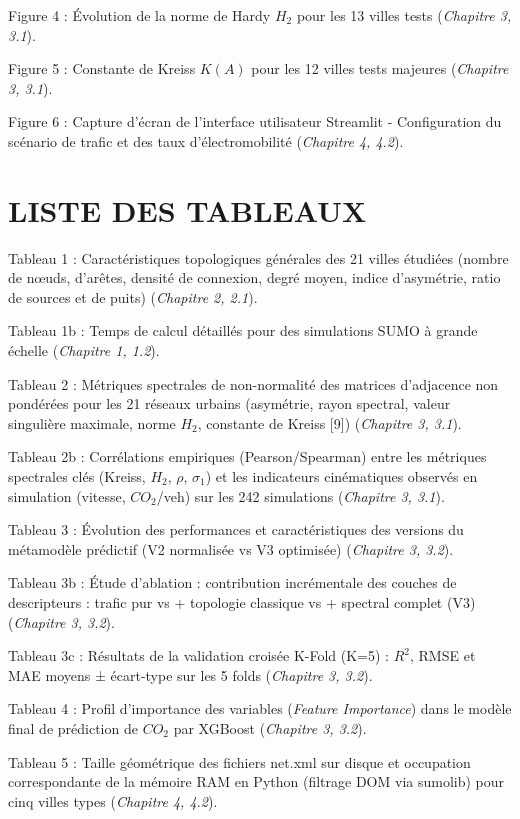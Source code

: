 \documentclass[10pt, a4paper]{article}
\begin{document}
Figure 4 : Évolution de la norme de Hardy \(H_2\) pour les 13 villes
tests (\emph{Chapitre 3, 3.1}).

Figure 5 : Constante de Kreiss \(K(A)\) pour les 12 villes tests
majeures (\emph{Chapitre 3, 3.1}).

Figure 6 : Capture d'écran de l'interface utilisateur Streamlit -
Configuration du scénario de trafic et des taux d'électromobilité
(\emph{Chapitre 4, 4.2}).

\newpage

\section{LISTE DES TABLEAUX}\label{liste-des-tableaux}

Tableau 1 : Caractéristiques topologiques générales des 21 villes
étudiées (nombre de nœuds, d'arêtes, densité de connexion, degré moyen,
indice d'asymétrie, ratio de sources et de puits) (\emph{Chapitre 2,
2.1}).

Tableau 1b : Temps de calcul détaillés pour des simulations SUMO à
grande échelle (\emph{Chapitre 1, 1.2}).

Tableau 2 : Métriques spectrales de non-normalité des matrices
d'adjacence non pondérées pour les 21 réseaux urbains (asymétrie, rayon
spectral, valeur singulière maximale, norme \(H_2\), constante de Kreiss
{[}9{]}) (\emph{Chapitre 3, 3.1}).

Tableau 2b : Corrélations empiriques (Pearson/Spearman) entre les
métriques spectrales clés (Kreiss, \(H_2\), \(\rho\), \(\sigma_1\)) et
les indicateurs cinématiques observés en simulation (vitesse,
\(CO_2\)/veh) sur les 242 simulations (\emph{Chapitre 3, 3.1}).

Tableau 3 : Évolution des performances et caractéristiques des versions
du métamodèle prédictif (V2 normalisée vs V3 optimisée) (\emph{Chapitre
3, 3.2}).

Tableau 3b : Étude d'ablation : contribution incrémentale des couches de
descripteurs : trafic pur vs + topologie classique vs + spectral complet
(V3) (\emph{Chapitre 3, 3.2}).

Tableau 3c : Résultats de la validation croisée K-Fold (K=5) : \(R^2\),
RMSE et MAE moyens ± écart-type sur les 5 folds (\emph{Chapitre 3,
3.2}).

Tableau 4 : Profil d'importance des variables (\emph{Feature
Importance}) dans le modèle final de prédiction de \(CO_2\) par XGBoost
(\emph{Chapitre 3, 3.2}).

Tableau 5 : Taille géométrique des fichiers net.xml sur disque et
occupation correspondante de la mémoire RAM en Python (filtrage DOM via
sumolib) pour cinq villes types (\emph{Chapitre 4, 4.2}).
\end{document}
